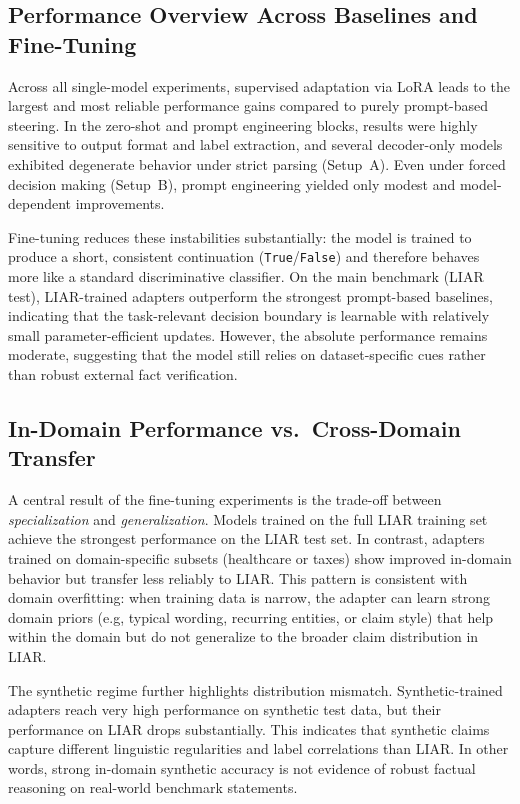 \subsection{Performance Overview Across Baselines and Fine-Tuning}

Across all single-model experiments, supervised adaptation via LoRA leads to the largest and most reliable performance gains compared to purely prompt-based steering. In the zero-shot and prompt engineering blocks, results were highly sensitive to output format and label extraction, and several decoder-only models exhibited degenerate behavior under strict parsing (Setup~A). Even under forced decision making (Setup~B), prompt engineering yielded only modest and model-dependent improvements.

Fine-tuning reduces these instabilities substantially: the model is trained to produce a short, consistent continuation (\texttt{True}/\texttt{False}) and therefore behaves more like a standard discriminative classifier. On the main benchmark (LIAR test), LIAR-trained adapters outperform the strongest prompt-based baselines, indicating that the task-relevant decision boundary is learnable with relatively small parameter-efficient updates. However, the absolute performance remains moderate, suggesting that the model still relies on dataset-specific cues rather than robust external fact verification.

\subsection{In-Domain Performance vs.\ Cross-Domain Transfer}

A central result of the fine-tuning experiments is the trade-off between \emph{specialization} and \emph{generalization}. Models trained on the full LIAR training set achieve the strongest performance on the LIAR test set. In contrast, adapters trained on domain-specific subsets (healthcare or taxes) show improved in-domain behavior but transfer less reliably to LIAR. This pattern is consistent with domain overfitting: when training data is narrow, the adapter can learn strong domain priors (e.g, typical wording, recurring entities, or claim style) that help within the domain but do not generalize to the broader claim distribution in LIAR.

The synthetic regime further highlights distribution mismatch. Synthetic-trained adapters reach very high performance on synthetic test data, but their performance on LIAR drops substantially. This indicates that synthetic claims capture different linguistic regularities and label correlations than LIAR. In other words, strong in-domain synthetic accuracy is not evidence of robust factual reasoning on real-world benchmark statements.

